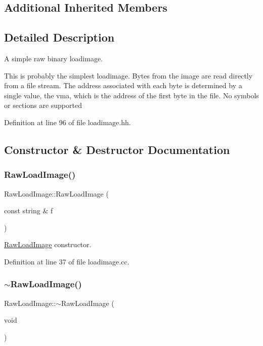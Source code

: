 \subsection*{Additional Inherited Members}


\subsection{Detailed Description}
A simple raw binary loadimage. 

This is probably the simplest loadimage. Bytes from the image are read directly from a file stream. The address associated with each byte is determined by a single value, the vma, which is the address of the first byte in the file. No symbols or sections are supported 

Definition at line 96 of file loadimage.\+hh.



\subsection{Constructor \& Destructor Documentation}
\mbox{\label{class_raw_load_image_aa3de896c28484086e22da165f678001f}} 
\subsubsection{\texorpdfstring{RawLoadImage()}{RawLoadImage()}}
{\footnotesize\ttfamily Raw\+Load\+Image\+::\+Raw\+Load\+Image (\begin{DoxyParamCaption}\item[{const string \&}]{f }\end{DoxyParamCaption})}



\mbox{\hyperlink{class_raw_load_image}{Raw\+Load\+Image}} constructor. 



Definition at line 37 of file loadimage.\+cc.

\mbox{\label{class_raw_load_image_ad7216066780c11564979f945e9068b08}} 
\subsubsection{\texorpdfstring{$\sim$RawLoadImage()}{~RawLoadImage()}}
{\footnotesize\ttfamily Raw\+Load\+Image\+::$\sim$\+Raw\+Load\+Image (\begin{DoxyParamCaption}\item[{void}]{ }\end{DoxyParamCaption})\hspace{0.3cm}{\ttfamily [virtual]}}



